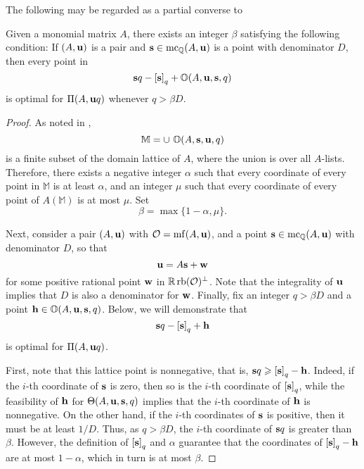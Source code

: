 \documentclass[11pt]{amsart}
\renewcommand{\!}[1]{{\color{red}\text{$\star$\,}#1\,$\star$}}
\begin{document}
The following may be regarded as a partial converse to 


\begin{proposition}
\label{uniform value: P}
Given a monomial matrix $A$, there exists an integer $\beta$ satisfying the following condition\textup:  If $(A, \mathbf{u})$ is a pair and $\mathbf{s} \in \operatorname{mc}_{\mathbb{Q}}(A, \mathbf{u})$ is a point with denominator $D$, then every point in
\[ \mathbf{s}q - \left[ \mathbf{s} \right]_q + \mathbb{O}(A, \mathbf{u}, \mathbf{s}, q) \] is optimal for $\Pi(A, \mathbf{u}q)$ whenever $q >  \beta D$. 
\end{proposition}

\begin{proof} As noted in , 
%
\[ \mathbb{M} = \cup  \ \mathbb{O}( A, \mathbf{s}, \mathbf{u}, q )\]
%
is a finite subset of the domain lattice of $A$, where the union is over all $A$-lists.  Therefore, there exists a negative integer $\alpha$ such that every coordinate of every point in $\mathbb{M}$ is at least $\alpha$, and an integer $\mu$ such that every coordinate of every point of $A (\mathbb{M})$ is at most $\mu$.  Set \[ \beta =  \max \{ 1-\alpha, \mu \}.\]

Next, consider a pair $(A, \mathbf{u})$ with $\mathcal{O} = \operatorname{mf}(A, \mathbf{u})$, and a point $\mathbf{s} \in \operatorname{mc}_{\mathbb{Q}}(A, \mathbf{u})$ with denominator $D$, so that  \[ \mathbf{u} = A \mathbf{s} + \mathbf{w} \] for some positive rational point $\mathbf{w}$ in $\mathbb{R} \operatorname{rb}(\mathcal{O})^{\perp}$.  Note that the integrality of $\mathbf{u}$ implies that $D$ is also a denominator for $\mathbf{w}$.  Finally, fix an integer $q > \beta D$ and a point $\mathbf{h} \in \mathbb{O}(A, \mathbf{u}, \mathbf{s}, q)$.  Below, we will demonstrate that \[ \mathbf{s}q - \left[ \mathbf{s} \right]_q + \mathbf{h}\] is optimal for $\Pi(A, \mathbf{u}q)$.  

First, note that this lattice point is nonnegative, that is,   $\mathbf{s}q \geqslant \left[ \mathbf{s} \right]_q - \mathbf{h}$.  Indeed, if the $i$-th coordinate of $\mathbf{s}$ is zero, then so is the $i$-th coordinate of $\left[ \mathbf{s} \right]_q$, while the feasibility of  $\mathbf{h}$ for $\Theta(A, \mathbf{u}, \mathbf{s}, q)$ implies that the $i$-th coordinate of $\mathbf{h}$ is nonnegative.  On the other hand, if the $i$-th coordinates of $\mathbf{s}$ is positive, then it must be at least $1/D$.  Thus, as $q > \beta D$, the $i$-th coordinate of $\mathbf{s}q$ is greater than $\beta$.  However, the definition of $\left[ \mathbf{s} \right]_q$ and $\alpha$ guarantee that the coordinates of $\left[ \mathbf{s} \right]_q - \mathbf{h}$ are at most $1-\alpha$, which in turn is at most $\beta$.


\end{proof}
\end{document}
